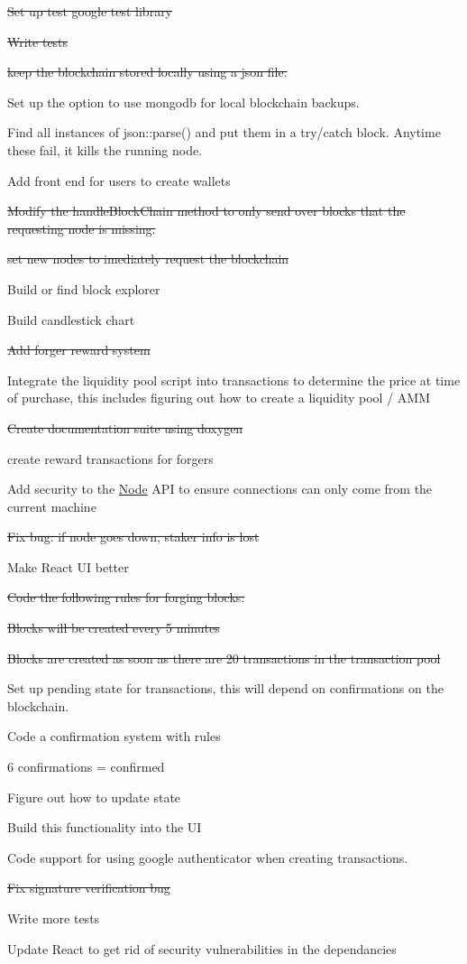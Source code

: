 
\begin{DoxyItemize}
\item \sout{Set up test google test library}
\item \sout{Write tests}
\item \sout{keep the blockchain stored locally using a json file.}
\item Set up the option to use mongodb for local blockchain backups.
\item Find all instances of json\+::parse() and put them in a try/catch block. Anytime these fail, it kills the running node.
\item Add front end for users to create wallets
\item \sout{Modify the handle\+Block\+Chain method to only send over blocks that the requesting node is missing.}
\item \sout{set new nodes to imediately request the blockchain}
\item Build or find block explorer
\item Build candlestick chart
\item \sout{Add forger reward system}
\item Integrate the liquidity pool script into transactions to determine the price at time of purchase, this includes figuring out how to create a liquidity pool / AMM
\item \sout{Create documentation suite using doxygen}
\item create reward transactions for forgers
\item Add security to the \mbox{\hyperlink{class_node}{Node}} API to ensure connections can only come from the current machine
\item \sout{Fix bug\+: if node goes down, staker info is lost}
\item Make React UI better
\item \sout{Code the following rules for forging blocks\+:}
\begin{DoxyItemize}
\item \sout{Blocks will be created every 5 minutes}
\item \sout{Blocks are created as soon as there are 20 transactions in the transaction pool}
\end{DoxyItemize}
\item Set up pending state for transactions, this will depend on confirmations on the blockchain.
\item Code a confirmation system with rules
\begin{DoxyItemize}
\item 6 confirmations = confirmed
\item Figure out how to update state
\item Build this functionality into the UI
\end{DoxyItemize}
\item Code support for using google authenticator when creating transactions.
\item \sout{Fix signature verification bug}
\item Write more tests
\item Update React to get rid of security vulnerabilities in the dependancies 
\end{DoxyItemize}